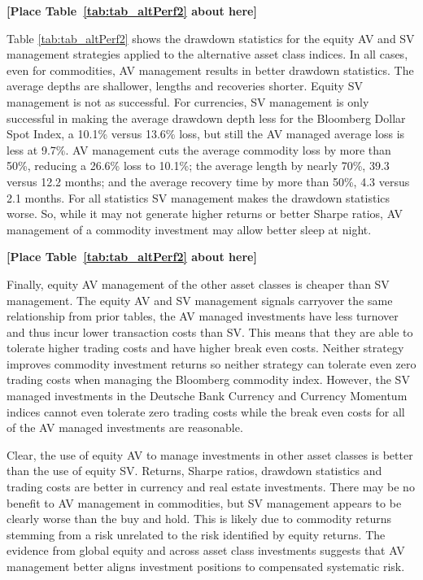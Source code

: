 \bigskip
\centerline{\bf [Place Table~\ref{tab:tab_altPerf2} about here]}
\bigskip

Table \ref{tab:tab_altPerf2} shows the drawdown statistics for the equity AV and SV management strategies applied to the alternative asset class indices. In all cases, even for commodities, AV management results in better drawdown statistics. The average depths are shallower, lengths and recoveries shorter. Equity SV management is not as successful. For currencies, SV management is only successful in making the average drawdown depth less for the Bloomberg Dollar Spot Index, a 10.1\% versus 13.6\% loss, but still the AV managed average loss is less at 9.7\%. AV management cuts the average commodity loss by more than 50\%, reducing a 26.6\% loss to 10.1\%; the average length by nearly 70\%, 39.3 versus 12.2 months; and the average recovery time by more than 50\%, 4.3 versus 2.1 months. For all statistics SV management makes the drawdown statistics worse. So, while it may not generate higher returns or better Sharpe ratios, AV management of a commodity investment may allow better sleep at night.

\bigskip
\centerline{\bf [Place Table~\ref{tab:tab_altPerf2} about here]}
\bigskip

Finally, equity AV management of the other asset classes is cheaper than SV management. The equity AV and SV management signals carryover the same relationship from prior tables, the AV managed investments have less turnover and thus incur lower transaction costs than SV. This means that they are able to tolerate higher trading costs and have higher break even costs. Neither strategy improves commodity investment returns so neither strategy can tolerate even zero trading costs when managing the Bloomberg commodity index. However, the SV managed investments in the Deutsche Bank Currency and Currency Momentum indices cannot even tolerate zero trading costs while the break even costs for all of the AV managed investments are reasonable.

Clear, the use of equity AV to manage investments in other asset classes is better than the use of equity SV. Returns, Sharpe ratios, drawdown statistics and trading costs are better in currency and real estate investments. There may be no benefit to AV management in commodities, but SV management appears to be clearly worse than the buy and hold. This is likely due to commodity returns stemming from a risk unrelated to the risk identified by equity returns. The evidence from global equity and across asset class investments suggests that AV management better aligns investment positions to compensated systematic risk.